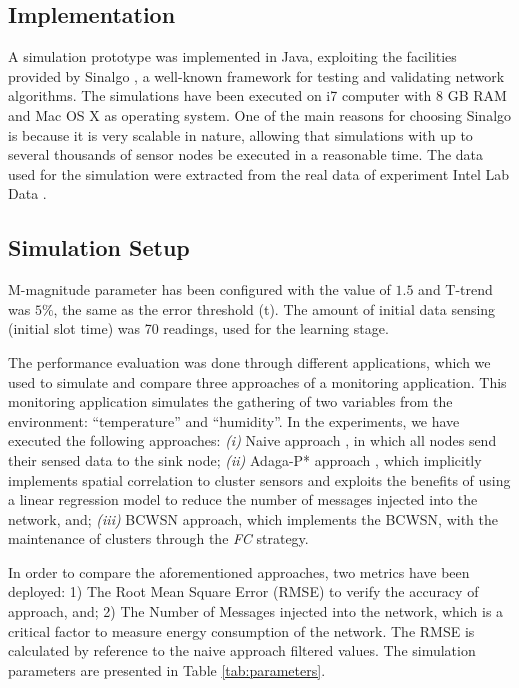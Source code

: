 \documentclass{acm_proc_article-sp}
\begin{document}
\subsection{Implementation}
\label{implementation}

A simulation prototype was implemented in Java, exploiting the facilities
provided by Sinalgo \cite{Sinalgo2007}, a well-known framework for testing and
validating network algorithms. The simulations have been executed on i7 computer
with 8 GB RAM and Mac OS X as operating system.
One of the main reasons for choosing Sinalgo is because it is very scalable in
nature, allowing that simulations with up to several thousands of sensor nodes
be executed in a reasonable time. The data used for the simulation were
extracted from the real data of experiment Intel Lab Data \cite{Intel2004}. 

\subsection{Simulation Setup}
\label{data-and-experiments}

M-magnitude parameter has been configured with the value of $1.5$ and T-trend
was $5\%$, the same as the error threshold (t). The amount of initial data sensing
(initial slot time) was 70 readings, used for the learning stage.
\vspace*{-.3cm}

The performance evaluation was done through different applications, which we used
to simulate and compare three approaches of a monitoring application. 
This monitoring application simulates the gathering of two variables from the
environment: ``temperature'' and ``humidity''.
In the experiments, we have executed the following approaches: {\it
  (i)} Naive approach \cite{Madden2005}, in which all nodes send their sensed
data to the sink node;  {\it
  (ii)} Adaga-P* approach \cite{MaiaSAC2013, MaiaACR2013}, which
implicitly implements spatial correlation to cluster sensors and exploits the
benefits of using a linear regression model to reduce the number of messages
injected into the network, and;  {\it 
  (iii)} BCWSN approach, which implements the BCWSN, with the maintenance of 
clusters through the \textit{FC} strategy.
\vspace*{-.3cm}

In order to compare the aforementioned approaches, two metrics have been
deployed: 1) The Root Mean Square Error (RMSE) to verify the accuracy of
approach, and; 2) The Number of Messages injected into the network, which is a
critical factor to measure energy consumption of the network. The RMSE is
calculated by reference to the naive approach filtered values.
The simulation parameters are presented in Table \ref{tab:parameters}.
\end{document}
